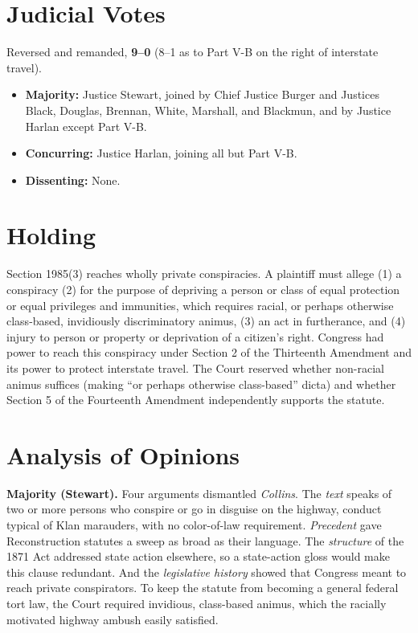 \documentclass[12pt]{article}
\begin{document}
\section{Judicial Votes}

Reversed and remanded, \textbf{9--0} (8--1 as to Part V-B on the right of interstate travel).
\begin{itemize}
\item \textbf{Majority:} Justice Stewart, joined by Chief Justice Burger and Justices Black, Douglas, Brennan, White, Marshall, and Blackmun, and by Justice Harlan except Part V-B.
\item \textbf{Concurring:} Justice Harlan, joining all but Part V-B.
\item \textbf{Dissenting:} None.
\end{itemize}

\section{Holding}

Section 1985(3) reaches wholly private conspiracies. A plaintiff must allege (1) a conspiracy (2) for the purpose of depriving a person or class of equal protection or equal privileges and immunities, which requires racial, or perhaps otherwise class-based, invidiously discriminatory animus, (3) an act in furtherance, and (4) injury to person or property or deprivation of a citizen's right. Congress had power to reach this conspiracy under Section 2 of the Thirteenth Amendment and its power to protect interstate travel. The Court reserved whether non-racial animus suffices (making ``or perhaps otherwise class-based'' dicta) and whether Section 5 of the Fourteenth Amendment independently supports the statute.

\section{Analysis of Opinions}

\textbf{Majority (Stewart).} Four arguments dismantled \textit{Collins}. The \emph{text} speaks of two or more persons who conspire or go in disguise on the highway, conduct typical of Klan marauders, with no color-of-law requirement. \emph{Precedent} gave Reconstruction statutes a sweep as broad as their language. The \emph{structure} of the 1871 Act addressed state action elsewhere, so a state-action gloss would make this clause redundant. And the \emph{legislative history} showed that Congress meant to reach private conspirators. To keep the statute from becoming a general federal tort law, the Court required invidious, class-based animus, which the racially motivated highway ambush easily satisfied.
\end{document}
